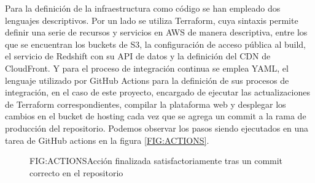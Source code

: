 
Para la definición de la infraestructura como código se han empleado dos lenguajes descriptivos. Por un lado se utiliza Terraform, cuya sintaxis permite definir una serie de recursos y servicios en AWS de manera descriptiva, entre los que se encuentran los buckets de S3, la configuración de acceso pública al build, el servicio de Redshift con su API de datos y la definición del CDN de CloudFront. Y para el proceso de integración continua se emplea YAML, el lenguaje utilizado por GitHub Actions para la definición de sus procesos de integración, en el caso de este proyecto, encargado de ejecutar las actualizaciones de Terraform correspondientes, compilar la plataforma web y desplegar los cambios en el bucket de hosting cada vez que se agrega un commit a la rama de producción del repositorio. Podemos observar los pasos siendo ejecutados en una tarea de GitHub actions en la figura \ref{FIG:ACTIONS}.

\begin{figure}[Ejemplo de tarea ejecutada por GitHub Actions]{FIG:ACTIONS}{Acción finalizada satisfactoriamente tras un commit correcto en el repositorio}
\end{figure}
